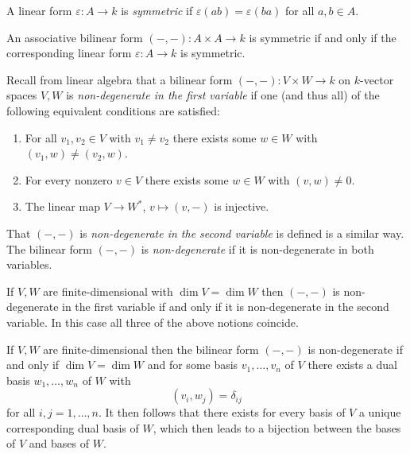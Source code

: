 \begin{definition}
  A linear form $\varepsilon \colon A \to k$ is \emph{symmetric} if $\varepsilon(ab) = \varepsilon(ba)$ for all $a, b \in A$.
\end{definition}


\begin{lemma}
  An associative bilinear form $(-,-) \colon A \times A \to k$ is symmetric if and only if the corresponding linear form $\varepsilon \colon A \to k$ is symmetric.
\end{lemma}


\begin{recall}
  Recall from linear algebra that a bilinear form $(-,-) \colon V \times W \to k$ on $k$-vector spaces $V,W$ is \emph{non-degenerate in the first variable} if one (and thus all) of the following equivalent conditions are satisfied:
  \begin{enumerate}
    \item
      For all $v_1, v_2 \in V$ with $v_1 \neq v_2$ there exists some $w \in W$ with $(v_1, w) \neq (v_2, w)$.
    \item
      For every nonzero $v \in V$ there exists some $w \in W$ with $(v,w) \neq 0$.
    \item
      The linear map $V \to W^*$, $v \mapsto (v,-)$ is injective.
  \end{enumerate}
  That $(-,-)$ is \emph{non-degenerate in the second variable} is defined is a similar way.
  The bilinear form $(-,-)$ is \emph{non-degenerate} if it is non-degenerate in both variables.
  
  If $V, W$ are finite-dimensional with $\dim V = \dim W$ then $(-,-)$ is non-degenerate in the first variable if and only if it is non-degenerate in the second variable.
  In this case all three of the above notions coincide.
  
  If $V,W$ are finite-dimensional then the bilinear form $(-,-)$ is non-degenerate if and only if $\dim V = \dim W$ and for some basis $v_1, \dotsc, v_n$ of $V$ there exists a dual basis $w_1, \dotsc, w_n$ of $W$ with
  \[
      (v_i, w_j)
    = \delta_{ij}
  \]
  for all $i,j = 1, \dotsc, n$.
  It then follows that there exists for every basis of $V$ a unique corresponding dual basis of $W$, which then leads to a bijection between the bases of $V$ and bases of $W$.
\end{recall}



